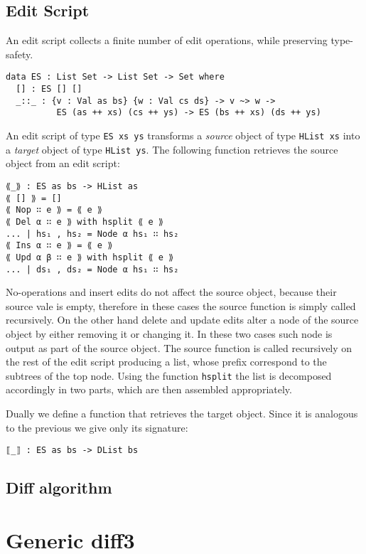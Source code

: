 \documentclass[preprint]{sigplanconf}
\begin{document}
	\subsection{Edit Script}
	An edit script collects a finite number of edit operations, 
	while preserving type-safety. 
\begin{verbatim}
data ES : List Set -> List Set -> Set where
  [] : ES [] []
  _::_ : {v : Val as bs} {w : Val cs ds} -> v ~> w -> 
          ES (as ++ xs) (cs ++ ys) -> ES (bs ++ xs) (ds ++ ys)
\end{verbatim}	
	An edit script of type \texttt{ES xs ys} transforms
	a \emph{source} object of type \texttt{HList xs} into
	a \emph{target} object of type \texttt{HList ys}. 
	The following function retrieves the source object from an edit script:			
\begin{verbatim}
⟪_⟫ : ES as bs -> HList as
⟪ [] ⟫ = []
⟪ Nop ∷ e ⟫ = ⟪ e ⟫
⟪ Del α ∷ e ⟫ with hsplit ⟪ e ⟫
... | hs₁ , hs₂ = Node α hs₁ ∷ hs₂
⟪ Ins α ∷ e ⟫ = ⟪ e ⟫
⟪ Upd α β ∷ e ⟫ with hsplit ⟪ e ⟫
... | ds₁ , ds₂ = Node α hs₁ ∷ hs₂
\end{verbatim}
	No-operations and insert edits do not affect the source object,
	because their source vale is empty, therefore in these cases the source 
	function is simply called recursively.
	On the other hand delete and update edits alter a node of the
	source object by either removing it or changing it.
	In these two cases such node is output as part of the source object.
	The source function is called recursively on the rest of the edit 
	script producing a list, whose prefix correspond to the subtrees of the
	top node. Using the function \texttt{hsplit} the list is decomposed 
	accordingly in two parts, which are then assembled appropriately.
	
	Dually we define a function that retrieves the target object.
	Since it is analogous to the previous we give only its signature:
	
\begin{verbatim}
⟦_⟧ : ES as bs -> DList bs
\end{verbatim}

	\subsection{Diff algorithm}

\section{Generic diff3}
\end{document}

